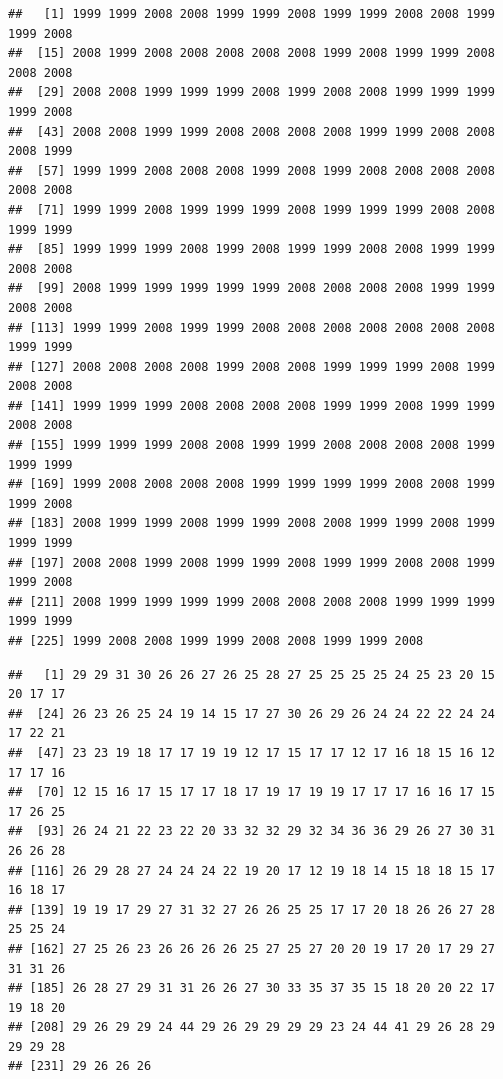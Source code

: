 \documentclass[]{book}
\newenvironment{Shaded}{\begin{snugshade}}{\end{snugshade}}
\newcommand{\OperatorTok}[1]{\textcolor[rgb]{0.81,0.36,0.00}{\textbf{#1}}}
\newcommand{\NormalTok}[1]{#1}
\theoremstyle{definition}
\theoremstyle{definition}
\theoremstyle{definition}
\theoremstyle{remark}
\begin{document}
\begin{verbatim}
##   [1] 1999 1999 2008 2008 1999 1999 2008 1999 1999 2008 2008 1999 1999 2008
##  [15] 2008 1999 2008 2008 2008 2008 2008 1999 2008 1999 1999 2008 2008 2008
##  [29] 2008 2008 1999 1999 1999 2008 1999 2008 2008 1999 1999 1999 1999 2008
##  [43] 2008 2008 1999 1999 2008 2008 2008 2008 1999 1999 2008 2008 2008 1999
##  [57] 1999 1999 2008 2008 2008 1999 2008 1999 2008 2008 2008 2008 2008 2008
##  [71] 1999 1999 2008 1999 1999 1999 2008 1999 1999 1999 2008 2008 1999 1999
##  [85] 1999 1999 1999 2008 1999 2008 1999 1999 2008 2008 1999 1999 2008 2008
##  [99] 2008 1999 1999 1999 1999 1999 2008 2008 2008 2008 1999 1999 2008 2008
## [113] 1999 1999 2008 1999 1999 2008 2008 2008 2008 2008 2008 2008 1999 1999
## [127] 2008 2008 2008 2008 1999 2008 2008 1999 1999 1999 2008 1999 2008 2008
## [141] 1999 1999 1999 2008 2008 2008 2008 1999 1999 2008 1999 1999 2008 2008
## [155] 1999 1999 1999 2008 2008 1999 1999 2008 2008 2008 2008 1999 1999 1999
## [169] 1999 2008 2008 2008 2008 1999 1999 1999 1999 2008 2008 1999 1999 2008
## [183] 2008 1999 1999 2008 1999 1999 2008 2008 1999 1999 2008 1999 1999 1999
## [197] 2008 2008 1999 2008 1999 1999 2008 1999 1999 2008 2008 1999 1999 2008
## [211] 2008 1999 1999 1999 1999 2008 2008 2008 2008 1999 1999 1999 1999 1999
## [225] 1999 2008 2008 1999 1999 2008 2008 1999 1999 2008
\end{verbatim}

\begin{Shaded}
\end{Shaded}

\begin{verbatim}
##   [1] 29 29 31 30 26 26 27 26 25 28 27 25 25 25 25 24 25 23 20 15 20 17 17
##  [24] 26 23 26 25 24 19 14 15 17 27 30 26 29 26 24 24 22 22 24 24 17 22 21
##  [47] 23 23 19 18 17 17 19 19 12 17 15 17 17 12 17 16 18 15 16 12 17 17 16
##  [70] 12 15 16 17 15 17 17 18 17 19 17 19 19 17 17 17 16 16 17 15 17 26 25
##  [93] 26 24 21 22 23 22 20 33 32 32 29 32 34 36 36 29 26 27 30 31 26 26 28
## [116] 26 29 28 27 24 24 24 22 19 20 17 12 19 18 14 15 18 18 15 17 16 18 17
## [139] 19 19 17 29 27 31 32 27 26 26 25 25 17 17 20 18 26 26 27 28 25 25 24
## [162] 27 25 26 23 26 26 26 26 25 27 25 27 20 20 19 17 20 17 29 27 31 31 26
## [185] 26 28 27 29 31 31 26 26 27 30 33 35 37 35 15 18 20 20 22 17 19 18 20
## [208] 29 26 29 29 24 44 29 26 29 29 29 29 23 24 44 41 29 26 28 29 29 29 28
## [231] 29 26 26 26
\end{verbatim}
\end{document}
